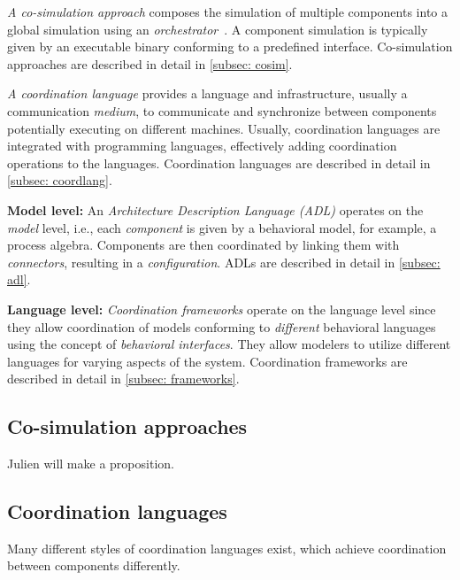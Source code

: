 \documentclass[runningheads]{llncs}
\begin{document}
\textit{A co-simulation approach} composes the simulation of multiple components into a global simulation using an \textit{orchestrator}~\cite{gomesCoSimulationSurvey2019}.
A component simulation is typically given by an executable binary conforming to a predefined interface.
Co-simulation approaches are described in detail in \autoref{subsec: cosim}.

\textit{A coordination language} provides a language and infrastructure, usually a communication \textit{medium}, to communicate and synchronize between components potentially executing on different machines.
Usually, coordination languages are integrated with programming languages, effectively adding coordination operations to the languages.
Coordination languages are described in detail in \autoref{subsec: coordlang}.

\textbf{Model level:}
An \textit{Architecture Description Language (ADL)} operates on the \textit{model} level, i.e., each \textit{component} is given by a behavioral model, for example, a process algebra.
Components are then coordinated by linking them with \textit{connectors}, resulting in a \textit{configuration}.
ADLs are described in detail in \autoref{subsec: adl}.

\textbf{Language level:}
\textit{Coordination frameworks} operate on the language level since they allow coordination of models conforming to \textit{different} behavioral languages using the concept of \textit{behavioral interfaces}.
They allow modelers to utilize different languages for varying aspects of the system.
Coordination frameworks are described in detail in \autoref{subsec: frameworks}.

\subsection{Co-simulation approaches} \label{subsec: cosim}

Julien will make a proposition.

\subsection{Coordination languages} \label{subsec: coordlang}
Many different styles of coordination languages exist, which achieve coordination between components differently.
\end{document}
